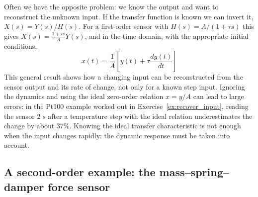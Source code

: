 \documentclass[letterpaper,11pt,leqno]{book}
\begin{document}
Often we have the opposite problem: we know the output and want to reconstruct the unknown input. If the transfer function is known we can invert it, $X(s) = Y(s)/H(s)$. For a first-order sensor with $H(s) = A/(1 + \tau s)$ this gives $X(s) = \frac{1 + \tau s}{A}Y(s)$, and in the time domain, with the appropriate initial conditions,
\begin{equation}
\boxed{x(t) = \frac{1}{A}\left[y(t) + \tau\frac{dy(t)}{dt}\right]}
\label{eq:input_reconstruction}
\end{equation}
This general result shows how a changing input can be reconstructed from the sensor output and its rate of change, not only for a known step input. Ignoring the dynamics and using the ideal zero-order relation $x = y/A$ can lead to large errors: in the Pt100 example worked out in Exercise~\ref{ex:recover_input}, reading the sensor $2\text{ s}$ after a temperature step with the ideal relation underestimates the change by about 37\%. Knowing the ideal transfer characteristic is not enough when the input changes rapidly: the dynamic response must be taken into account.

\subsection{A second-order example: the mass--spring--damper force sensor}
\label{sec:second_order}
\end{document}
